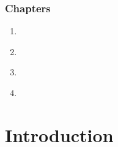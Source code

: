 \begin{frame}[fragile,label=outline] 
\frametitle{Chapters}
\begin{center}
\begin{minipage}{3.25in}
\begin{enumerate}
\item  \hyperlink{s-intro<1>}      {\BUTTON {\orow{\sIntro}}} \\
\item  \hyperlink{s-project<1>}    {\BUTTON {\erow{\sProject}}} \\
\item  \hyperlink{s-parameters<1>} {\BUTTON {\erow{\sParameters}}} \\
\item  \hyperlink{s-devel<1>} {\BUTTON {\erow{\sDevel}}}
\end{enumerate}
\end{minipage}
\end{center}
\end{frame}

\NEWMOD

\section{Introduction}








